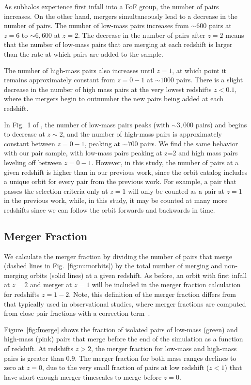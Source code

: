 \documentclass[twocolumn,linenumbers]{aastex631}
\newcommand{\chambe}{\citet{Chamberlain2024}}
\begin{document}
As subhalos experience first infall into a FoF group, the number of pairs increases. 
On the other hand, mergers simultaneously lead to a decrease in the number of pairs.
The number of low-mass pairs increases from $\sim600$ pairs at $z=6$ to $\sim6,600$ at $z=2$. 
The decrease in the number of pairs after $z=2$ means that the number of low-mass pairs that are merging at each redshift is larger than the rate at which pairs are added to the sample.

The number of high-mass pairs also increases until $z=1$, at which point it remains approximately constant from $z=0-1$ at $\sim1000$ pairs. 
There is a slight decrease in the number of high mass pairs at the very lowest redshifts $z<0.1$, where the mergers begin to outnumber the new pairs being added at each redshift.

In Fig.~1 of \chambe{}, the number of low-mass pairs peaks (with $\sim3,000$ pairs) and begins to decrease at $z\sim2$, and the number of high-mass pairs is approximately constant between $z=0-1$, peaking at $\sim700$ pairs. 
We find the same behavior with our pair sample, with low-mass pairs peaking at z=2 and high mass pairs leveling off between $z=0-1$. 
However, in this study, the number of pairs at a given redshift is higher than in our previous work, since the orbit catalog includes a unique orbit for every pair from the previous work.
For example, a pair that passes the \chambe{} selection criteria only at $z=1$ will only be counted as a pair at $z=1$ in the previous work, while, in this study, it may be counted at many more redshifts since we can follow the orbit forwards and backwards in time. 

\subsection{Merger Fraction}\label{sec:pairprops-frac}
    We calculate the merger fraction by dividing the number of pairs that merge (dashed lines in Fig.~\ref{fig:numorbits}) by the total number of merging and non-merging orbits (solid lines) at a given redshift. 
    As before, an orbit with first infall at $z=2$ and merger at $z=1$ will be included in the merger fraction calculation for redshifts $z=1-2$.
    Note, this definition of the merger fraction differs from that typically used in observational studies, where merger fractions are computed from close pair fractions with a correction term~\cite[e.g.,][]{Ventou2019}. 
    
    Figure~\ref{fig:fmerge} shows the fraction of isolated pairs of low-mass (green) and high-mass (pink) pairs that merge before the end of the simulation as a function of redshift. 
    At redshifts $z>2$, the merger fraction for low-mass and high-mass pairs is greater than $0.9$.
    The merger fraction for both mass ranges declines to zero at $z=0$, due to the very small fraction of pairs at low redshift ($z<1$) that have short enough merger timescales to merge before $z=0$.
    
\end{document}
